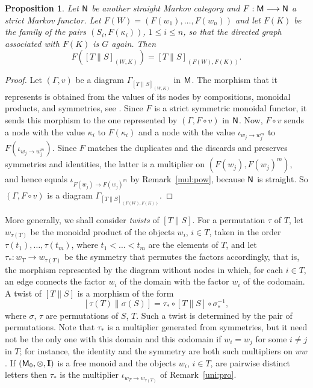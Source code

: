 \documentclass[12pt]{amsart}
\theoremstyle{plain}
\newtheorem{prop}[thm]{Proposition}
\theoremstyle{definition}
\theoremstyle{remark}
\numberwithin{equation}{section}
\theoremstyle{plain}
\newcommand{\0}{\emptyset}
\newcommand{\fun}{\longrightarrow}
\newcommand{\cat}[1]{\textup{\textsf{#1}}}
\newcommand{\memph}[1]{{\color{magenta}\emph{#1}}}
\newcommand{\moi}{\mathbf{I}}
\newcommand{\stri}{\Gamma}
\begin{document}
\begin{prop}\label{mar:fun:eff}
Let $\cat N$ be another straight Markov category and $F : \cat M \fun \cat N$ a strict Markov functor. Let $F(W) = (F(w_1), \ldots, F(w_n))$ and let $F(K)$ be the family of the pairs $(S_i, F(\kappa_i))$, $1 \leq i \leq n$, so that the directed graph associated with $F(K)$ is $G$ again. Then
\[
F([T \| S]_{(W, K)}) = [T \| S]_{(F(W), F(K))}.
\]
\end{prop}
\begin{proof}
Let $(\Gamma, v)$ be a diagram $\stri_{[T \| S]_{(W, K)}}$ in $\cat M$. The morphism that it represents is obtained from the values of its nodes by compositions, monoidal products, and symmetries, see \cite[Chapter~2, \S~2]{joyal1991geometry}. Since $F$ is a strict symmetric monoidal functor, it sends this morphism to the one represented by $(\Gamma, F \circ v)$ in $\cat N$. Now, $F \circ v$ sends a node with the value $\kappa_i$ to $F(\kappa_i)$ and a node with the value $\iota_{w_j \rightarrow w_j^m}$ to $F(\iota_{w_j \rightarrow w_j^m})$. Since $F$ matches the duplicates and the discards and preserves symmetries and identities, the latter is a multiplier on $(F(w_j), F(w_j)^m)$, and hence equals $\iota_{F(w_j) \rightarrow F(w_j)^m}$ by Remark~\ref{mul:pow}, because $\cat N$ is straight. So $(\Gamma, F \circ v)$ is a diagram $\stri_{[T \| S]_{(F(W), F(K))}}$.
\end{proof}

More generally, we shall consider  \memph{twists} of $[T \| S]$. For a permutation $\tau$ of $T$, let $w_{\tau(T)}$ be the monoidal product of the objects $w_i$, $i \in T$, taken in the order $\tau(t_1), \ldots, \tau(t_m)$, where $t_1 < \ldots < t_m$ are the elements of $T$, and let $\tau_* : w_T \fun w_{\tau(T)}$ be the symmetry that permutes the factors accordingly, that is, the morphism represented by the diagram without nodes in which, for each $i \in T$, an edge connects the factor $w_i$ of the domain with the factor $w_i$ of the codomain. A twist of $[T \| S]$ is a morphism of the form
\[
[\tau(T) \| \sigma(S)] = \tau_* \circ [T \| S] \circ \sigma_*^{-1},
\]
where $\sigma$, $\tau$ are permutations of $S$, $T$. Such a twist is  determined by the pair of permutations. Note that $\tau_*$ is a multiplier generated from symmetries, but it need not be the only one with this domain and this codomain if $w_i = w_j$ for some $i \neq j$ in $T$; for instance, the identity and the symmetry are both such multipliers on $ww$. If $(\cat M_0, \otimes, \moi)$ is a free monoid and the objects $w_i$, $i \in T$, are pairwise distinct letters then $\tau_*$ is the multiplier $\iota_{w_T \rightarrow w_{\tau(T)}}$ of Remark~\ref{uni:pro}.
\end{document}
